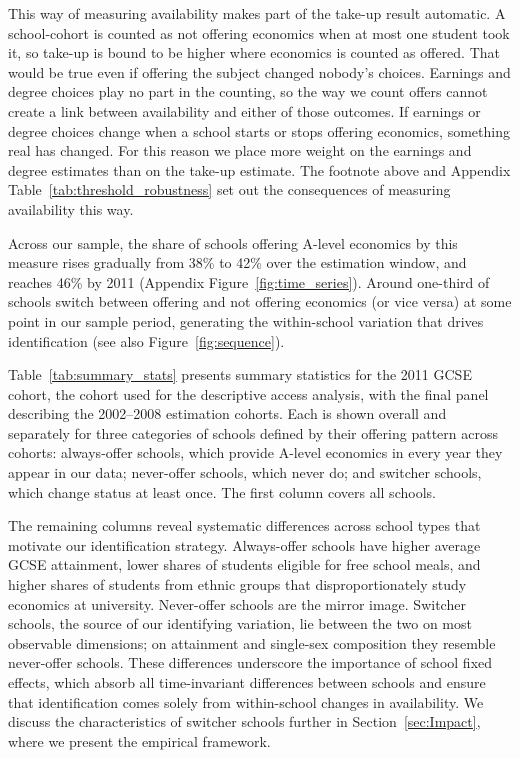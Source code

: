 This way of measuring availability makes part of the take-up result automatic. A school-cohort is counted as not offering economics when at most one student took it, so take-up is bound to be higher where economics is counted as offered. That would be true even if offering the subject changed nobody's choices. Earnings and degree choices play no part in the counting, so the way we count offers cannot create a link between availability and either of those outcomes. If earnings or degree choices change when a school starts or stops offering economics, something real has changed. For this reason we place more weight on the earnings and degree estimates than on the take-up estimate. The footnote above and Appendix Table~\ref{tab:threshold_robustness} set out the consequences of measuring availability this way.

Across our sample, the share of schools offering A-level economics by this measure rises gradually from 38\% to 42\% over the estimation window, and reaches 46\% by 2011 (Appendix Figure~\ref{fig:time_series}). Around one-third of schools switch between offering and not offering economics (or vice versa) at some point in our sample period, generating the within-school variation that drives identification (see also Figure~\ref{fig:sequence}).



Table~\ref{tab:summary_stats} presents summary statistics for the 2011 GCSE cohort, the cohort used for the descriptive access analysis, with the final panel describing the 2002--2008 estimation cohorts. Each is shown overall and separately for three categories of schools defined by their offering pattern across cohorts: always-offer schools, which provide A-level economics in every year they appear in our data; never-offer schools, which never do; and switcher schools, which change status at least once. The first column covers all schools.

The remaining columns reveal systematic differences across school types that motivate our identification strategy. Always-offer schools have higher average GCSE attainment, lower shares of students eligible for free school meals, and higher shares of students from ethnic groups that disproportionately study economics at university. Never-offer schools are the mirror image. Switcher schools, the source of our identifying variation, lie between the two on most observable dimensions; on attainment and single-sex composition they resemble never-offer schools. These differences underscore the importance of school fixed effects, which absorb all time-invariant differences between schools and ensure that identification comes solely from within-school changes in availability. We discuss the characteristics of switcher schools further in Section~\ref{sec:Impact}, where we present the empirical framework.


